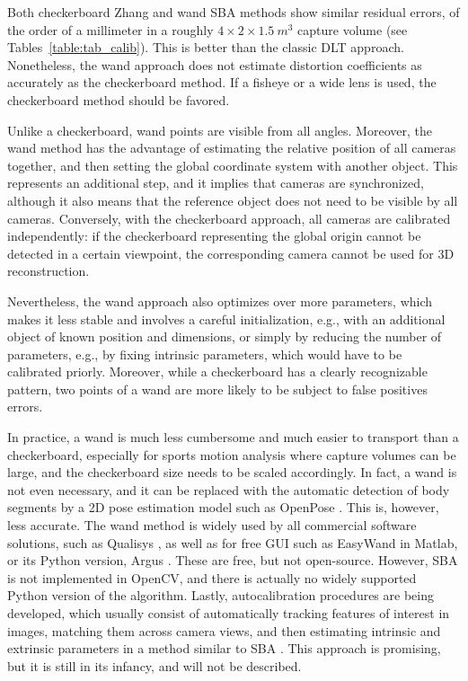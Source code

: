 Both checkerboard Zhang and wand SBA methods show similar residual errors, of the order of a millimeter in a roughly $4\times 2 \times 1.5\ m^3$ capture volume \cite{Pribanic2009,Silvatti2012} (see Tables~\ref{table:tab_calib}). This is better than the classic DLT approach. Nonetheless, the wand approach does not estimate distortion coefficients as accurately as the checkerboard method. If a fisheye or a wide lens is used, the checkerboard method should be favored.

Unlike a checkerboard, wand points are visible from all angles. Moreover, the wand method has the advantage of estimating the relative position of all cameras together, and then setting the global coordinate system with another object. This represents an additional step, and it implies that cameras are synchronized, although it also means that the reference object does not need to be visible by all cameras. Conversely, with the checkerboard approach, all cameras are calibrated independently: if the checkerboard representing the global origin cannot be detected in a certain viewpoint, the corresponding camera cannot be used for 3D reconstruction. 

Nevertheless, the wand approach also optimizes over more parameters, which makes it less stable and involves a careful initialization, e.g., with an additional object of known position and dimensions, or simply by reducing the number of parameters, e.g., by fixing intrinsic parameters, which would have to be calibrated priorly. Moreover, while a checkerboard has a clearly recognizable pattern, two points of a wand are more likely to be subject to false positives errors.

In practice, a wand is much less cumbersome and much easier to transport than a checkerboard, especially for sports motion analysis where capture volumes can be large, and the checkerboard size needs to be scaled accordingly. In fact, a wand is not even necessary, and it can be replaced with the automatic detection of body segments by a 2D pose estimation model such as OpenPose \cite{Takahashi2018, Xu2021, Liu2022a}. This is, however, less accurate. The wand method is widely used by all commercial software solutions, such as Qualisys \cite{Qualisys}, as well as for free GUI such as EasyWand \cite{Theriault2014} in Matlab, or its Python version, Argus \cite{Argus,Jackson2016}. These are free, but not open-source. However, SBA is not implemented in OpenCV, and there is actually no widely supported Python version of the algorithm. Lastly, autocalibration procedures are being developed, which usually consist of automatically tracking features of interest in images, matching them across camera views, and then estimating intrinsic and extrinsic parameters in a method similar to SBA \cite{Faugeras1992,Hartley2003}. This approach is promising, but it is still in its infancy, and will not be described.

